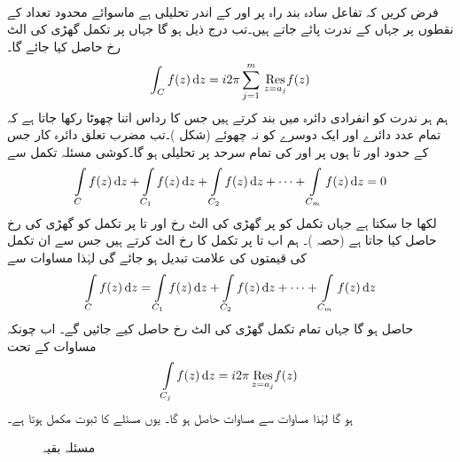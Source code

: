 \quad {}\\
فرض کریں کہ تفاعل  سادہ بند راہ  پر اور  کے اندر  تحلیلی ہے ماسوائے محدود تعداد کے نقطوں  پر جہاں  کے ندرت پائے جاتے ہیں۔تب درج ذیل ہو گا جہاں  پر تکمل گھڑی کی الٹ رخ  حاصل کیا جائے گا۔
\begin{align}\label{مساوات_بقیہ_مسئلہ_بقیہ_الف}
\int_C f(z)\dif z=i2\pi\sum\limits_{j=1}^{m} \,\underset{z=a_j}{\Res} f(z)
\end{align} 
\quad
ہم ہر ندرت  کو انفرادی دائرہ  میں بند کرتے ہیں جس کا رداس اتنا چھوٹا رکھا جاتا ہے کہ تمام  عدد دائرے اور  ایک دوسرے کو نہ چھوئے (شکل )۔تب مضرب تعلق دائرہ کار  جس کے حدود  اور  تا  ہوں پر اور  کی تمام سرحد پر  تحلیلی ہو گا۔کوشی مسئلہ تکمل سے 
\begin{align}\label{مساوات_بقیہ_مسئلہ_بقیہ_ب}
\int\limits_C f(z)\dif z+\int\limits_{C_1} f(z)\dif z+\int\limits_{C_2} f(z)\dif z+\cdots+\int\limits_{C_m} f(z)\dif z=0
\end{align}
لکھا جا سکتا ہے جہاں تکمل کو  پر گھڑی کی الٹ رخ اور  تا  پر تکمل کو گھڑی کی رخ حاصل کیا جاتا ہے (حصہ )۔ ہم اب  تا  پر تکمل کا رخ الٹ کرتے ہیں جس سے ان تکمل کی قیمتوں کی علامت تبدیل ہو جائے گی لہٰذا مساوات  سے 
\begin{align}\label{مساوات_بقیہ_مسئلہ_بقیہ_پ}
\int\limits_C f(z)\dif z=\int\limits_{C_1} f(z)\dif z+\int\limits_{C_2} f(z)\dif z+\cdots+\int\limits_{C_m} f(z)\dif z
\end{align}
حاصل ہو گا جہاں تمام تکمل گھڑی کی الٹ رخ حاصل کیے جائیں گے۔ اب چونکہ مساوات  کے تحت
\begin{align*}
\int\limits_{C_j} f(z)\dif z=i2\pi \,\underset{z=a_j\hfill}{\Res} f(z)
\end{align*}
ہو گا لہٰذا مساوات  سے مساوات  حاصل ہو گا۔ یوں مسئلے کا ثبوت مکمل ہوتا ہے۔
\begin{figure}
\centering
{}
\caption{مسئلہ بقیہ}
\label{شکل_بقیہ_مسئلہ_بقیہ}
\end{figure}

